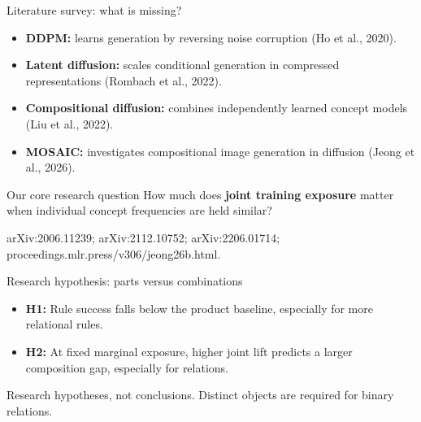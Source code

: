 \documentclass[aspectratio=169,11pt]{beamer}
\newcommand{\smallnote}[1]{{\par\vspace{1.5mm}\scriptsize\color{gray!80!black}#1\par}}
\begin{document}
\begin{frame}{Literature survey: what is missing?}
\begin{itemize}
  \setlength{\itemsep}{3pt}
  \item \textbf{DDPM:} learns generation by reversing noise corruption (Ho et al., 2020).
  \item \textbf{Latent diffusion:} scales conditional generation in compressed representations (Rombach et al., 2022).
  \item \textbf{Compositional diffusion:} combines independently learned concept models (Liu et al., 2022).
  \item \textbf{MOSAIC:} investigates compositional image generation in diffusion (Jeong et al., 2026).
\end{itemize}

\vspace{3mm}
\begin{block}{Our core research question}
  How much does \textbf{joint training exposure} matter when individual concept frequencies are held similar?
\end{block}

\vfill
\smallnote{arXiv:2006.11239; arXiv:2112.10752; arXiv:2206.01714; proceedings.mlr.press/v306/jeong26b.html.}
\end{frame}

\begin{frame}{Research hypothesis: parts versus combinations}
\begin{center}
\end{center}

\vspace{2mm}
\begin{itemize}
  \setlength{\itemsep}{4pt}
  \item \textbf{H1:} Rule success falls below the product baseline, especially for more relational rules.
  \item \textbf{H2:} At fixed marginal exposure, higher joint lift predicts a larger composition gap, especially for relations.
\end{itemize}

\vfill
\smallnote{Research hypotheses, not conclusions. Distinct objects are required for binary relations.}
\end{frame}
\end{document}
